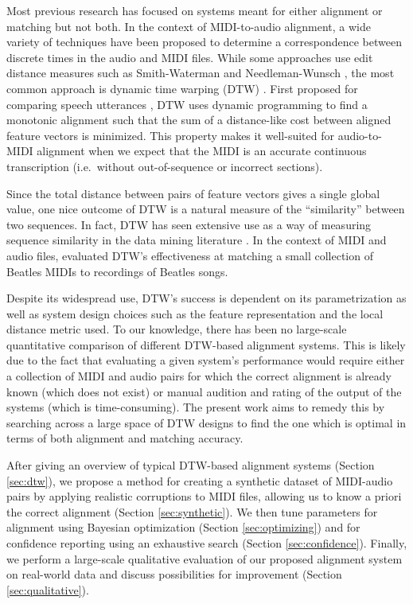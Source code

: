 \documentclass{article}
\begin{document}
Most previous research has focused on systems meant for either alignment or matching but not both.
In the context of MIDI-to-audio alignment, a wide variety of techniques have been proposed to determine a correspondence between discrete times in the audio and MIDI files.
While some approaches use edit distance measures such as Smith-Waterman \cite{ewert2012towards} and Needleman-Wunsch \cite{grachten2013automatic}, the most common approach is dynamic time warping (DTW) \cite{muller2007dynamic}.
First proposed for comparing speech utterances \cite{sakoe1978dynamic}, DTW uses dynamic programming to find a monotonic alignment such that the sum of a distance-like cost between aligned feature vectors is minimized.
This property makes it well-suited for audio-to-MIDI alignment when we expect that the MIDI is an accurate continuous transcription (i.e.\ without out-of-sequence or incorrect sections).

Since the total distance between pairs of feature vectors gives a single global value, one nice outcome of DTW is a natural measure of the ``similarity'' between two sequences.
In fact, DTW has seen extensive use as a way of measuring sequence similarity in the data mining literature \cite{berndt1994using}.
In the context of MIDI and audio files, \cite{hu2003polyphonic} evaluated DTW's effectiveness at matching a small collection of Beatles MIDIs to recordings of Beatles songs.

Despite its widespread use, DTW's success is dependent on its parametrization as well as system design choices such as the feature representation and the local distance metric used.
To our knowledge, there has been no large-scale quantitative comparison of different DTW-based alignment systems.
This is likely due to the fact that evaluating a given system's performance would require either a collection of MIDI and audio pairs for which the correct alignment is already known (which does not exist) or manual audition and rating of the output of the systems (which is time-consuming).
The present work aims to remedy this by searching across a large space of DTW designs to find the one which is optimal in terms of both alignment and matching accuracy.

After giving an overview of typical DTW-based alignment systems (Section \ref{sec:dtw}), we propose a method for creating a synthetic dataset of MIDI-audio pairs by applying realistic corruptions to MIDI files, allowing us to know a priori the correct alignment (Section \ref{sec:synthetic}).
We then tune parameters for alignment using Bayesian optimization (Section \ref{sec:optimizing}) and for confidence reporting using an exhaustive search (Section \ref{sec:confidence}).
Finally, we perform a large-scale qualitative evaluation of our proposed alignment system on real-world data and discuss possibilities for improvement (Section \ref{sec:qualitative}).
\end{document}
